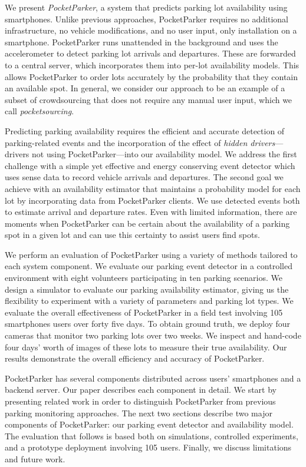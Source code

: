 We present \textit{PocketParker}, a system that predicts parking lot
availability using smartphones. Unlike previous approaches, PocketParker
requires no additional infrastructure, no vehicle modifications, and no user
input, only installation on a smartphone.  PocketParker runs unattended in
the background and uses the accelerometer to detect parking lot
arrivals and departures.  These are forwarded to a central server, which
incorporates them into per-lot availability models.  This allows PocketParker
to order lots accurately by the probability that they contain an available
spot.  In general, we consider our approach to be an example of a subset of
crowdsourcing that does not require any manual user input, which we call
\textit{pocketsourcing}.

Predicting parking availability requires the efficient and accurate detection
of parking-related events and the incorporation of the effect of
\textit{hidden drivers}---drivers not using PocketParker---into our
availability model. We address the first challenge with a simple yet effective
and energy conserving event detector which uses sense data to record vehicle
arrivals and departures.  The second goal we achieve with an availability
estimator that maintains a probability model for each lot by incorporating
data from PocketParker clients. We use detected events both to estimate
arrival and departure rates.  Even with limited information, there are moments
when PocketParker can be certain about the availability of a parking spot in a
given lot and can use this certainty to assist users find spots.

We perform an evaluation of PocketParker using a variety of methods
tailored to each system component. We evaluate our parking event detector in
a controlled environment with eight volunteers participating in ten parking
scenarios. We design a simulator to evaluate our parking availability
estimator, giving us the flexibility to experiment with a variety of
parameters and parking lot types. We evaluate the overall effectiveness of
PocketParker in a field test involving 105 smartphones users over forty five
days. To obtain ground truth, we deploy four cameras that monitor two parking
lots over two weeks. We inspect and hand-code four days' worth of images of
these lots to measure their true availability. Our results demonstrate the
overall efficiency and accuracy of PocketParker.

PocketParker has several components distributed across users' smartphones and
a backend server. Our paper describes each component in detail. We start by
presenting related work in order to distinguish PocketParker from previous
parking monitoring approaches. The next two sections describe two major
components of PocketParker: our parking event detector and availability model.
The evaluation that follows is based both on simulations, controlled
experiments, and a prototype deployment involving 105 users.  Finally, we
discuss limitations and future work.


